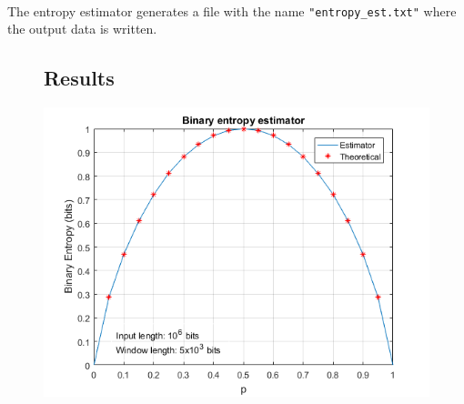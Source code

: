 \documentclass[]{article}
\begin{document}
\paragraph{}

The entropy estimator generates a file with the name \texttt{"entropy\_est.txt"} where the output data is written.

\begin{figure}[H]
\subsection*{Results}
    \centerline{
       \includegraphics[scale=0.75]{images/BinEntropyResults.png}
    }
\end{figure}
\end{document}
